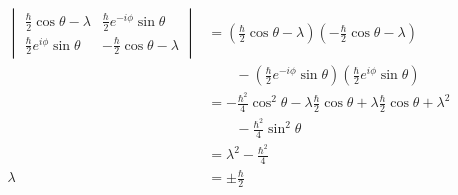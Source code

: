 \documentclass{article}
\begin{document}
\begin{align*}
  \begin{vmatrix}
    \frac{\hbar}{2} \cos \theta - \lambda  & \frac{\hbar}{2} e^{-i \phi} \sin \theta \\
    \frac{\hbar}{2} e^{i \phi} \sin \theta & -\frac{\hbar}{2} \cos \theta - \lambda
  \end{vmatrix} & = \left( \frac{\hbar}{2} \cos \theta - \lambda \right) \left( -\frac{\hbar}{2} \cos \theta - \lambda \right)                                                                                     \\
                                                                                      & \qquad - \left( \frac{\hbar}{2} e^{-i \phi} \sin \theta \right) \left( \frac{\hbar}{2} e^{i \phi} \sin \theta \right)      \\
                                                                                      & = -\frac{\hbar^2}{4} \cos^2 \theta - \lambda \frac{\hbar}{2} \cos \theta + \lambda \frac{\hbar}{2} \cos \theta + \lambda^2 \\
                                                                                      & \qquad -\frac{\hbar^2}{4} \sin^2 \theta                                                                                    \\
                                                                                      & = \lambda^2 - \frac{\hbar^2}{4}                                                                                            \\
  \lambda                                                                             & = \pm \frac{\hbar}{2}
\end{align*}

\setcounter{subsection}{34}
\subsection{}
\end{document}
